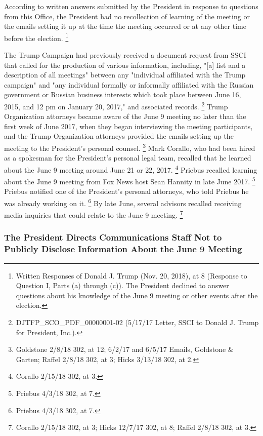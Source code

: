 {According to written answers submitted by the President in response to questions from this Office, the President had no recollection of learning of the meeting or the emails setting it up at the time the meeting occurred or at any other time before the election.%
\footnote{Written Responses of Donald J. Trump (Nov. 20, 2018), at 8 (Response to Question I, Parts (a) through (c)).
The President declined to answer questions about his knowledge of the June 9 meeting or other events after the election.}

The Trump Campaign had previously received a document request from SSCI that called for the production of various information, including, "[a] list and a description of all meetings" between any "individual affiliated with the Trump campaign" and "any individual formally or informally affiliated with the Russian government or Russian business interests which took place between June 16, 2015, and 12 pm on January 20, 2017," and associated records.%
\footnote{DJTFP\_SCO\_PDF\_00000001-02 (5/17/17 Letter, SSCI to Donald J. Trump for President, Inc.).}
Trump Organization attorneys became aware of the June 9 meeting no later than the first week of June 2017, when they began interviewing the meeting participants, and the Trump Organization attorneys provided the emails setting up the meeting to the President's personal counsel.%
\footnote{Goldstone 2/8/18 302, at 12;
6/2/17 and 6/5/17 Emails, Goldstone \& Garten;
Raffel 2/8/18 302, at 3;
Hicks 3/13/18 302, at 2.}
Mark Corallo, who had been hired as a spokesman for the President's personal legal team, recalled that he learned about the June 9 meeting around June 21 or 22, 2017.%
\footnote{Corallo 2/15/18 302, at 3.}
Priebus recalled learning about the June 9 meeting from Fox News host Sean Hannity in late June 2017.%
\footnote{Priebus 4/3/18 302, at 7.}
Priebus notified one of the President's personal attorneys, who told Priebus he was already working on it.%
\footnote{Priebus 4/3/18 302, at 7.}
By late June, several advisors recalled receiving media inquiries that could relate to the June 9 meeting.%
\footnote{Corallo 2/15/18 302, at 3;
Hicks 12/7/17 302, at 8;
Raffel 2/8/18 302, at 3.}

\subsubsection{The President Directs Communications Staff Not to Publicly Disclose Information About the June 9 Meeting}

}
